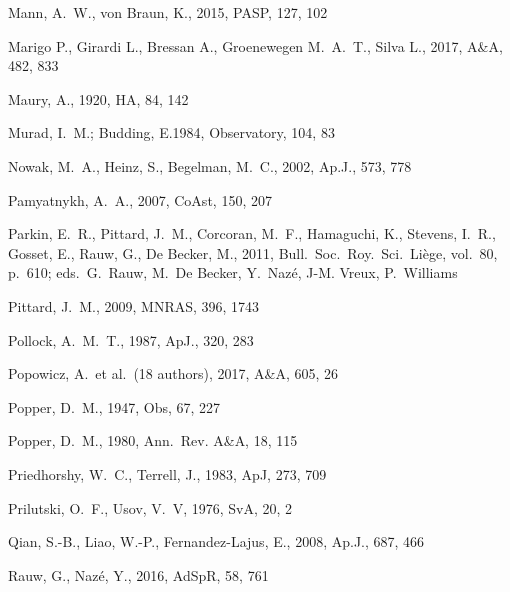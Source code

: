 \documentclass[useAMS,usenatbib]{mnras}                                                                           \usepackage[pdftex]{graphicx}
\begin{document}
\begin{thebibliography}{}
Mann, A.\ W., von Braun, K., 2015, PASP, 127, 102

Marigo P., Girardi L., Bressan A., Groenewegen 
M.\ A.\ T., Silva L.,  2017, A\&A, {482}, 833

Maury, A., 1920, HA, 84, 142

Murad, I.\ M.; Budding, E.1984,  Observatory, 104, 83

Nowak, M.\ A., Heinz, S., Begelman, M.\ C., 2002, Ap.J., 573, 778

Pamyatnykh, A.\ A., 2007, CoAst, 150, 207

Parkin, E.\ R., Pittard, J.\ M., Corcoran, M.\ F., Hamaguchi, K., Stevens, I.\ R., 
Gosset, E., Rauw, G., De Becker, M., 2011, Bull.\
Soc.\ Roy.\ Sci.\ Li\`{e}ge, vol.\ 80, p.\ 610;
eds.\ G.\ Rauw, M.\ De Becker, Y.\ Naz\'{e}, J-M. Vreux, P.\ Williams

Pittard, J.\ M., 2009, MNRAS, 396, 1743

Pollock, A.\ M.\ T.,  1987,  ApJ., 320, 283

Popowicz, A.\ et al.\ (18 authors), 2017, A{\&A}, 605, 26

Popper, D.\ M., 1947, Obs, 67, 227

Popper, D.\ M., 1980, Ann.\ Rev. A{\&}A, 18, 115

Priedhorshy, W.\ C.,  Terrell, J., 1983, ApJ, 273, 709
 
Prilutski, O.\ F.,  Usov, V.\ V, 1976, SvA, 20, 2 
 
Qian, S.-B., Liao, W.-P., Fernandez-Lajus, E., 2008, Ap.J., 687, 466

Rauw, G., Naz\'{e}, Y.,   2016, AdSpR, 58, 761


\end{thebibliography}
\end{document}
